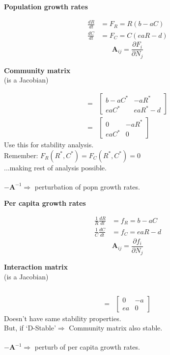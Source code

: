 \documentclass{article}
\begin{document}
\begin{minipage}[t]{0.5\textwidth}
\begin{center}\textbf{Population growth rates}\end{center}
\begin{align*}
	\frac{dR}{dt}&=F_R = R(b-aC)\\
	\frac{dC}{dt}&=F_C=C(eaR-d)
\end{align*}
\begin{equation*}\mathbf{A}_{ij}=\frac{\partial F_i}{\partial N_j}\end{equation*}
\begin{center}\textbf{Community matrix}\\(is a Jacobian)\end{center}
\begin{align*}
	=&\begin{bmatrix}
	b-aC^* & -aR^*\\eaC^* & eaR^* - d
	\end{bmatrix}\\
	=&\begin{bmatrix}
		0 & -aR^*\\eaC^* & 0
		\end{bmatrix}
\end{align*}
Use this for stability analysis.\\
Remember: $F_R(R^*,C^*)=F_C(R^*,C^*)=0$\\
...making rest of analysis possible.\\
\\
$-\mathbf{A}^{-1} \Rightarrow$ perturbation of popn growth rates.
\end{minipage}
\begin{minipage}[t]{0.5\textwidth}
\begin{center}\textbf{Per capita growth rates}\end{center}
\begin{align*}
	\frac{1}{R}\frac{dR}{dt}&=f_R = b-aC\\
	\frac{1}{C}\frac{dC}{dt}&=f_C=eaR-d
\end{align*}
\begin{equation*}\mathbf{A}_{ij}=\frac{\partial f_i}{\partial N_j}\end{equation*}
\begin{center}\textbf{Interaction matrix}\\(is a Jacobian)\end{center}
\begin{align*}
\\
\\
	=&\begin{bmatrix}
		0 & -a\\ea & 0
		\end{bmatrix}
\end{align*}
Doesn't have same stability properties.\\
But, if `D-Stable'$\Rightarrow$ Community matrix also stable.\\
\\
$-\mathbf{A}^{-1} \Rightarrow$  perturb of per capita growth rates.
\end{minipage}
\end{document}
